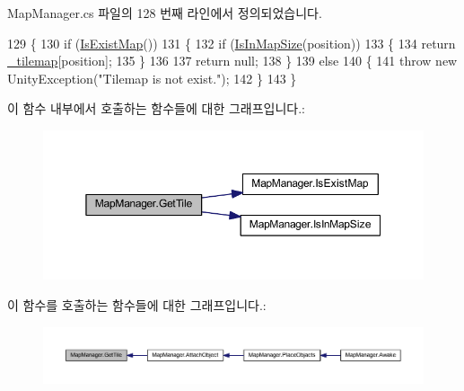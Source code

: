 Map\+Manager.\+cs 파일의 128 번째 라인에서 정의되었습니다.


\begin{DoxyCode}
129     \{
130         \textcolor{keywordflow}{if} (\hyperlink{class_map_manager_a9a18efae73b0d690d2bc6c8ac8703a02}{IsExistMap}())
131         \{
132             \textcolor{keywordflow}{if} (\hyperlink{class_map_manager_a504d7a68ace64557bc3c3254a8b1cddc}{IsInMapSize}(position))
133             \{
134                 \textcolor{keywordflow}{return} \hyperlink{class_map_manager_a58f7635d8e19795f3845a3f85e2b4ac3}{\_tilemap}[position];
135             \}
136 
137             \textcolor{keywordflow}{return} null;
138         \}
139         \textcolor{keywordflow}{else}
140         \{
141             \textcolor{keywordflow}{throw} \textcolor{keyword}{new} UnityException(\textcolor{stringliteral}{"Tilemap is not exist."});
142         \}
143     \}
\end{DoxyCode}


이 함수 내부에서 호출하는 함수들에 대한 그래프입니다.\+:\nopagebreak
\begin{figure}[H]
\begin{center}
\leavevmode
\includegraphics[width=350pt]{class_map_manager_ae457099efdd1a804add3b851b2bc7691_cgraph}
\end{center}
\end{figure}




이 함수를 호출하는 함수들에 대한 그래프입니다.\+:\nopagebreak
\begin{figure}[H]
\begin{center}
\leavevmode
\includegraphics[width=350pt]{class_map_manager_ae457099efdd1a804add3b851b2bc7691_icgraph}
\end{center}
\end{figure}


